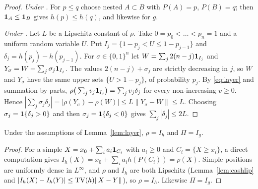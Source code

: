 \begin{proof}
\emph{Under \axRM.} For $p\le q$ choose nested $A\subset B$ with $P(A)=p$, $P(B)=q$; then $\mathbf 1_A\le\mathbf 1_B$ gives
$h(p)\le h(q)$, and likewise for $g$.

\emph{Under \axRC.} Let $L$ be a Lipschitz constant of $\rho$. Take $0=p_0<\dots<p_n=1$ and a uniform random
variable $U$. Put $I_j=\{1-p_j<U\le1-p_{j-1}\}$ and $\delta_j=h(p_j)-h(p_{j-1})$. For $\sigma\in\{0,1\}^n$ let
$W=\sum_j2(n-j)\mathbf 1_{I_j}$ and $Y_\sigma=W+\sum_j\sigma_j\mathbf 1_{I_j}$. The values $2(n-j)+\sigma_j$ are strictly
decreasing in $j$, so $W$ and $Y_\sigma$ have the same upper sets $\{U>1-p_j\}$, of probability $p_j$. By
\eqref{eq:layer} and summation by parts, $\rho\big(\sum_jv_j\mathbf 1_{I_j}\big)=\sum_jv_j\delta_j$ for every
non-increasing $v\ge0$. Hence $|\sum_j\sigma_j\delta_j|=|\rho(Y_\sigma)-\rho(W)|\le L\|Y_\sigma-W\|\le L$.
Choosing $\sigma_j=\mathbf 1\{\delta_j>0\}$ and then $\sigma_j=\mathbf 1\{\delta_j<0\}$ gives $\sum_j|\delta_j|\le2L$. \qedhere
\end{proof}

\begin{lemma}[Representation]\label{lem:rep}
Under the assumptions of Lemma~\ref{lem:layer}, $\rho=I_h$ and $\Pi=I_g$.
\end{lemma}

\begin{proof}
For a simple $X=x_0+\sum_ia_i\mathbf 1_{C_i}$ with $a_i\ge0$ and $C_i=\{X\ge x_i\}$, a direct computation gives
$I_h(X)=x_0+\sum_ia_ih(P(C_i))=\rho(X)$. Simple positions are uniformly dense in $L^\infty$, and $\rho$ and
$I_h$ are both Lipschitz (Lemma~\ref{lem:cashlip} and $|I_h(X)-I_h(Y)|\le\mathrm{TV}(h)\|X-Y\|$), so $\rho=I_h$.
Likewise $\Pi=I_g$. \qedhere
\end{proof}

